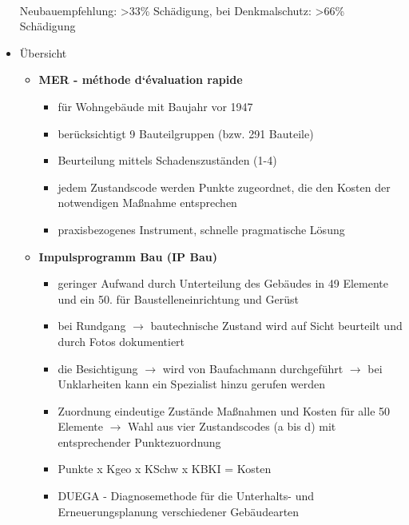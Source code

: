 \documentclass[fleqn,twoside,dvipsnames]{article}
\begin{document}
\begin{itemize}
{\begin{tabular}{|c|c|l|}
                \end{tabular}}
                \vspace*{2mm} \\ Neubauempfehlung: >33\% Schädigung, bei Denkmalschutz: >66\% Schädigung \vspace*{2mm} 
            \item Übersicht
                \begin{itemize}
                    \item \textbf{MER - méthode d‘évaluation rapide}
                        \begin{itemize}
                            \item für Wohngebäude mit Baujahr vor 1947
                            \item berücksichtigt 9 Bauteilgruppen (bzw. 291 Bauteile)
                            \item Beurteilung mittels Schadenszuständen (1-4)
                            \item jedem Zustandscode werden Punkte zugeordnet, die den Kosten der notwendigen Maßnahme entsprechen
                            \item praxisbezogenes Instrument, schnelle pragmatische Lösung
                        \end{itemize}
                    \item \textbf{Impulsprogramm Bau (IP Bau)}
                        \begin{itemize}
                            \item geringer Aufwand durch Unterteilung des Gebäudes in 49 Elemente und ein 50. für Baustelleneinrichtung und Gerüst
                            \item bei Rundgang $\rightarrow$ bautechnische Zustand wird auf Sicht beurteilt und durch Fotos dokumentiert
                            \item die Besichtigung $\rightarrow$ wird von Baufachmann durchgeführt $\rightarrow$ bei Unklarheiten kann ein Spezialist hinzu gerufen werden
                            \item Zuordnung eindeutige Zustände Maßnahmen und Kosten für alle 50 Elemente $\rightarrow$ Wahl aus vier Zustandscodes (a bis d) mit entsprechender Punktezuordnung
                            \item Punkte x Kgeo x KSchw x KBKI = Kosten
                            \item DUEGA - Diagnosemethode für die Unterhalts- und Erneuerungsplanung verschiedener Gebäudearten\\

\end{itemize}
\end{itemize}
\end{itemize}
\end{document}
